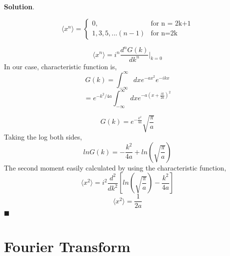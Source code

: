 \documentclass[12pt]{article}
\renewcommand{\=}[1]{\stackrel{#1}{=}} %
\theoremstyle{definition}
\newenvironment{s}{%
        \begin{trivlist} \item \textbf{Solution}. }{%
            \hspace*{\fill} $\blacksquare$\end{trivlist}}%
\begin{document}
\begin{s}

\begin{equation}
   \langle x^n \rangle = \begin{cases} 
   0,  & \text{for n = 2k+1} \\
   1,3,5, ... (n-1) & \text{for n=2k} 
\end{cases}
\end{equation}
%

%
\begin{equation}
 \langle x^n \rangle    = i^n  \frac{d^n G(k)}{dk^n} \bigg|_{k=0}
\end{equation}
%
In our case, characteristic function is,
%
\begin{equation}
     G(k)  = \int_{-\infty}^{\infty} dx   e^{-ax^2} e^{-ikx} 
\end{equation}
%
%
\begin{equation}
       = e^{-k^2 / 4a} \int_{-\infty}^{\infty} dx   e^{-a(x + \frac{ik}{2a})^2}  
\end{equation}

\begin{equation}
	G(k) =e^{-\frac{k^2} {4a}} \sqrt{\frac{\pi} {a}}
\end{equation}
%
Taking the log both sides,
%
\begin{equation}
	ln G(k) =-\frac{k^2} {4a}  + ln \left(\sqrt{\frac{\pi} {a}} \right)
\end{equation}
%
The second moment easily calculated by using the characteristic function,
%
\begin{equation}
	\langle x^2 \rangle = i^2 \frac{d^2} {dk^2} \left[ ln (\sqrt{\frac{\pi} {a} } ) - \frac{k^2} {4a} \right]
\end{equation}
%
%
\begin{equation}
	\langle x^2 \rangle = \frac{1}{2a}
\end{equation}
%
\end{s}
\section{Fourier Transform}
\end{document}
